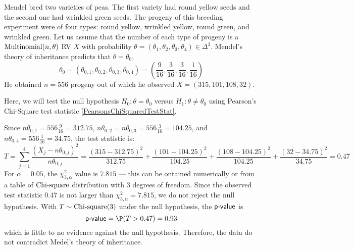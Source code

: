 \begin{example}
Mendel bred two varieties of peas. The first variety had round yellow seeds and the second one had wrinkled green seeds. 
The progeny of this breeding experiment were of four types: round yellow, wrinkled yellow, round green, and wrinkled green. 
Let us assume that the number of each type of progeny is a $\mbox{{\rm Multinomial}}(n,\theta)$ RV $X$ with probability $\theta = (\theta_1,\theta_2,\theta_3,\theta_4) \in \Delta^3$.  
Mendel's theory of inheritance predicts that $\theta = \theta_0$,
\[
\theta_0 = (\theta_{0,1}, \theta_{0,2}, \theta_{0,3}, \theta_{0,4}) = \left( \frac{9}{16}, \frac{3}{16}, \frac{3}{16}, \frac{1}{16} \right)
\]
He obtained $n=556$ progeny out of which he observed $X = (315,101,108,32)$. 

Here, we will test the null hypothesis $H_0: \theta = \theta_0$ versus $H_1: \theta \neq \theta_0$ using Pearson's Chi-Square test statistic \eqref{PearsonsChiSquaredTestStat}.

Since $n \theta_{0,1} = 556 \frac{9}{16} = 312.75$, $n \theta_{0,2} = n \theta_{0,3} = 556 \frac{3}{16} = 104.25$, and $n \theta_{0,4} = 556 \frac{1}{16} = 34.75$, the test statistic is:
\[
T = \sum_{j=1}^4 \frac{(X_j - n \theta_{0,j})^2}{n \theta_{0,j}} = 
\frac{(315-312.75)^2}{312.75} + \frac{(101-104.25)^2}{104.25} + \frac{(108-104.25)^2}{104.25} + \frac{(32-34.75)^2}{34.75} = 0.47
\]
For $\alpha=0.05$, the $\chi^2_{3,\alpha}$ value is $7.815$ --- this can be ontained numerically or from a table of $\mbox{{\rm Chi-square}}$ distribution with $3$ degrees of freedom. 
Since the observed test statistic $0.47$ is not larger than $\chi^2_{3,\alpha}=7.815$, we do not reject the null hypothesis. 
With $T \sim \mbox{{\rm Chi-square}}(3)$ under the null hypothesis, the $\mbox{\sf{p-value}}$ is
\[
\pvalue = \P ( T > 0.47) = 0.93
\]
which is little to no evidence against the null hypothesis. 
Therefore, the data do not contradict Medel's theory of inheritance.
\end{example}

\newpage


